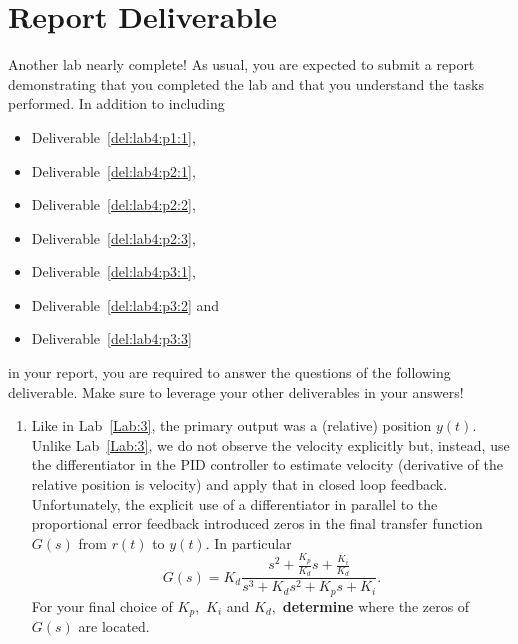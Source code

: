 \section{Report Deliverable}\label{Lab:4:Report}
Another lab nearly complete!
As usual, you are expected to submit a report demonstrating that you completed the lab and that you understand the tasks performed.
In addition to including
\begin{itemize}
  \item{Deliverable~\ref{del:lab4:p1:1},}
  \item{Deliverable~\ref{del:lab4:p2:1},}
  \item{Deliverable~\ref{del:lab4:p2:2},}
  \item{Deliverable~\ref{del:lab4:p2:3},}
  \item{Deliverable~\ref{del:lab4:p3:1},}
  \item{Deliverable~\ref{del:lab4:p3:2} and}
  \item{Deliverable~\ref{del:lab4:p3:3}}
\end{itemize}
in your report, you are required to answer the questions of the following deliverable.
Make sure to leverage your other deliverables in your answers!
\begin{deliverable}[label={lab4:report}]
  \begin{enumerate}[label={(\arabic*)}]
    \item{%
      Like in Lab~\ref{Lab:3}, the primary output was a (relative) position \(y(t).\)
      Unlike Lab~\ref{Lab:3}, we do not observe the velocity explicitly but, instead, use the differentiator in the PID controller to estimate velocity (derivative of the relative position is velocity) and apply that in closed loop feedback.
      Unfortunately, the explicit use of a differentiator in parallel to the proportional error feedback introduced zeros in the final transfer function \(G(s)\) from \(r(t)\) to \(y(t).\)
      In particular
      \[
        G(s) = K_d \frac{s^2 + \frac{K_p}{K_d} s + \frac{K_i}{K_d}}{s^3 + K_d s^2 + K_p s + K_i}.
      \]
      For your final choice of \(K_p,\) \(K_i\) and \(K_d,\) \textbf{determine} where the zeros of \(G(s)\) are located.
      \label{lab5:report:q1}
    }
  \end{enumerate}
\end{deliverable}

